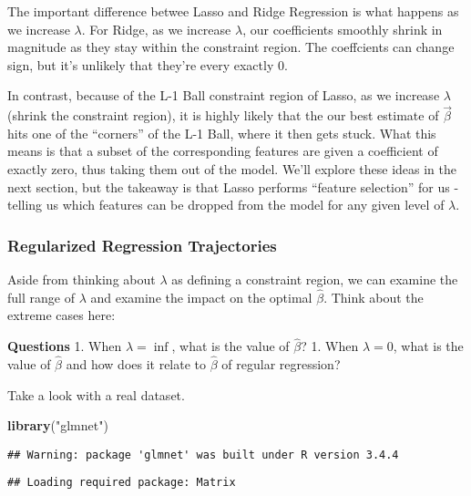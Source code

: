 \documentclass[]{article}
\newenvironment{Shaded}{\begin{snugshade}}{\end{snugshade}}
\newcommand{\KeywordTok}[1]{\textcolor[rgb]{0.13,0.29,0.53}{\textbf{{#1}}}}
\newcommand{\StringTok}[1]{\textcolor[rgb]{0.31,0.60,0.02}{{#1}}}
\newcommand{\NormalTok}[1]{{#1}}
\begin{document}
The important difference betwee Lasso and Ridge Regression is what
happens as we increase \(\lambda\). For Ridge, as we increase
\(\lambda\), our coefficients smoothly shrink in magnitude as they stay
within the constraint region. The coeffcients can change sign, but it's
unlikely that they're every exactly 0.

In contrast, because of the L-1 Ball constraint region of Lasso, as we
increase \(\lambda\) (shrink the constraint region), it is highly likely
that the our best estimate of \(\vec{\beta}\) hits one of the
``corners'' of the L-1 Ball, where it then gets stuck. What this means
is that a subset of the corresponding features are given a coefficient
of exactly zero, thus taking them out of the model. We'll explore these
ideas in the next section, but the takeaway is that Lasso performs
``feature selection'' for us - telling us which features can be dropped
from the model for any given level of \(\lambda\).

\subsubsection{Regularized Regression
Trajectories}\label{regularized-regression-trajectories}

Aside from thinking about \(\lambda\) as defining a constraint region,
we can examine the full range of \(\lambda\) and examine the impact on
the optimal \(\hat{\beta}\). Think about the extreme cases here:

\textbf{Questions} 1. When \(\lambda = \inf\), what is the value of
\(\hat{\beta}\)? 1. When \(\lambda = 0\), what is the value of
\(\hat{\beta}\) and how does it relate to \(\hat{\beta}\) of regular
regression?

Take a look with a real dataset.

\begin{Shaded}
\begin{Highlighting}[]
\KeywordTok{library}\NormalTok{(}\StringTok{"glmnet"}\NormalTok{)}
\end{Highlighting}
\end{Shaded}

\begin{verbatim}
## Warning: package 'glmnet' was built under R version 3.4.4
\end{verbatim}

\begin{verbatim}
## Loading required package: Matrix
\end{verbatim}
\end{document}
